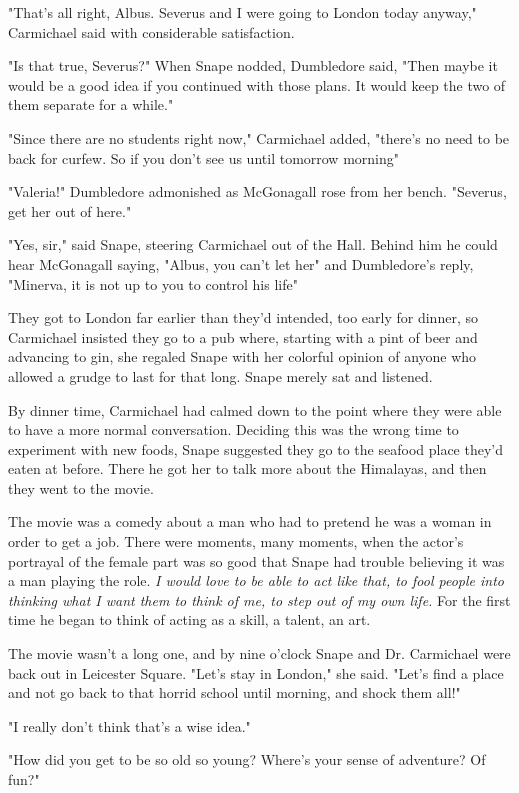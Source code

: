 "That's all right, Albus. Severus and I were going to London today anyway," Carmichael said with considerable satisfaction.

"Is that true, Severus?" When Snape nodded, Dumbledore said, "Then maybe it would be a good idea if you continued with those plans. It would keep the two of them separate for a while."

"Since there are no students right now," Carmichael added, "there's no need to be back for curfew. So if you don't see us until tomorrow morning{\el}"

"Valeria!" Dumbledore admonished as McGonagall rose from her bench. "Severus, get her out of here."

"Yes, sir," said Snape, steering Carmichael out of the Hall. Behind him he could hear McGonagall saying, "Albus, you can't let her{\el}" and Dumbledore's reply, "Minerva, it is not up to you to control his life{\el}"

They got to London far earlier than they'd intended, too early for dinner, so Carmichael insisted they go to a pub where, starting with a pint of beer and advancing to gin, she regaled Snape with her colorful opinion of anyone who allowed a grudge to last for that long. Snape merely sat and listened.

By dinner time, Carmichael had calmed down to the point where they were able to have a more normal conversation. Deciding this was the wrong time to experiment with new foods, Snape suggested they go to the seafood place they'd eaten at before. There he got her to talk more about the Himalayas, and then they went to the movie.

The movie was a comedy about a man who had to pretend he was a woman in order to get a job. There were moments, many moments, when the actor's portrayal of the female part was so good that Snape had trouble believing it was a man playing the role. \emph{I would love to be able to act like that, to fool people into thinking what I want them to think of me, to step out of my own life.} For the first time he began to think of acting as a skill, a talent, an art.

The movie wasn't a long one, and by nine o'clock Snape and Dr. Carmichael were back out in Leicester Square. "Let's stay in London," she said. "Let's find a place and not go back to that horrid school until morning, and shock them all!"

"I really don't think that's a wise idea."

"How did you get to be so old so young? Where's your sense of adventure? Of fun?"

